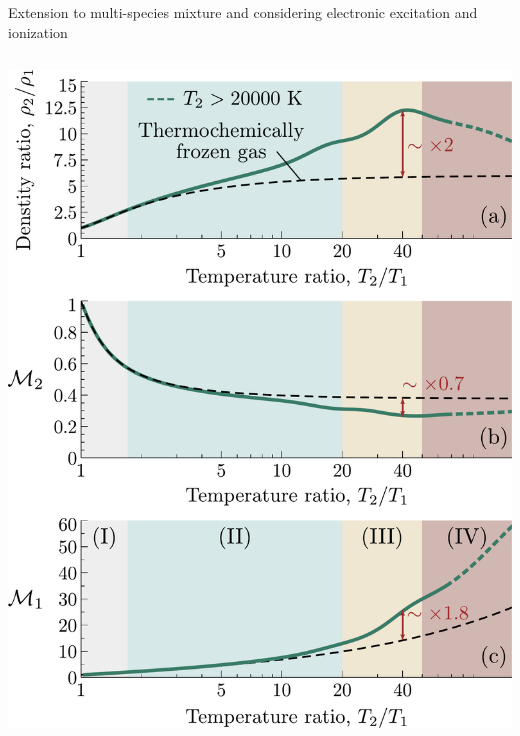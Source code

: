\documentclass[9pt, aspectratio=1609]{beamer}
\begin{document}
\begin{frame}{\normalsize Extension to multi-species mixture and considering electronic excitation and ionization}
\begin{columns}[c]
\begin{column}{.45\textwidth}
\begin{center}
            \includegraphics[scale=0.23]{figures/aiaa2023/RH_jump_AIAA2023_labels.pdf}
        \end{center}
        \end{column}%
    \end{columns}
\end{frame}
\end{document}
